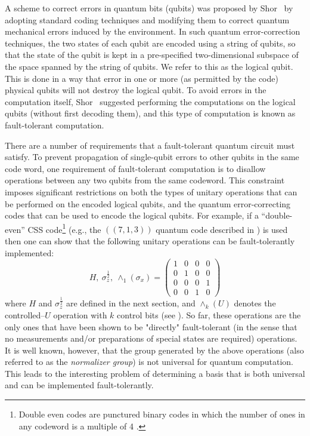 \documentclass[twocolumn,11pt]{article}
\begin{document}
A scheme to correct errors in quantum bits (qubits) was proposed
by Shor~\cite{shorQEC} by adopting standard coding techniques and
modifying them to correct quantum mechanical errors induced by the
environment.  In such quantum error-correction techniques, the two states of
each qubit are encoded using a string of qubits, so that the state of the
qubit is kept in a pre-specified two-dimensional subspace of the space spanned by the
string of qubits.  We refer to this as the logical qubit.  This is done
in a way that error in one or more (as permitted by the code) physical 
qubits will not destroy the logical qubit.
To avoid errors in the computation itself, 
Shor~\cite{shorFT} suggested performing  the
computations on the logical qubits (without first decoding them), and this
type of computation is known as fault-tolerant computation. 

There are a number of requirements that a fault-tolerant quantum circuit
must satisfy. To prevent propagation of single-qubit errors to other
qubits in the same code word, one requirement of fault-tolerant computation is to 
disallow operations between any two qubits from the same codeword. This constraint 
imposes significant restrictions on both the types of unitary operations that can be performed on the
encoded logical qubits, and the quantum error-correcting codes that can be used to
encode the logical qubits. For example, if a ``double-even'' CSS code\footnote{Double 
even codes are punctured  binary codes in which the number of ones in any
codeword is a multiple of 4 \cite{shorFT}.} (e.g.,
the $((7,1,3))$ quantum code described in \cite{calderbank,steane}) is
used then one can show that the following unitary operations can be fault-tolerantly implemented:
\begin{equation} H, \ \sigma_z^\frac{1}{2}, \
\wedge_1(\sigma_x) =\left(\begin{array}{rrrr}1&0&0&0\\0&1&0&0\\
0&0&0&1\\0&0&1&0\end{array}\right) \label{cliff-group} \end{equation}
where $H$ and $\sigma_z^\frac{1}{2}$ are defined in the next section,
and $\wedge_k(U)$ denotes the controlled--$U$ operation with $k$ control bits
(see \cite{egfqc}). So far, these operations are the only
ones that have been shown to be "directly" fault-tolerant (in the sense that
no measurements and/or preparations of special states are required) operations. 
It is well known, however, that the group generated by the above 
operations (also referred to as the {\em normalizer group}) is not universal for 
quantum computation. This leads to the interesting problem of determining a
basis that is both universal and can be implemented fault-tolerantly.
\end{document}

